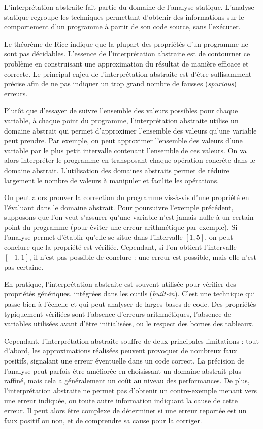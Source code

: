 L'interprétation abstraite fait partie du domaine de l'analyse statique.
L'analyse statique regroupe les techniques permettant d'obtenir des
informations sur le comportement d'un programme à partir de son code
source, sans l'exécuter.

Le théorème de Rice indique que la plupart des propriétés d'un programme
ne sont pas décidables. L'essence de l'interprétation abstraite est de
contourner ce problème en construisant une approximation du résultat de
manière efficace et correcte. Le principal enjeu de
l'interprétation abstraite est d'être suffisamment précise afin de ne
pas indiquer un trop grand nombre de fausses (\emph{spurious}) erreurs.

Plutôt que d'essayer de suivre l'ensemble des valeurs possibles pour chaque
variable, à chaque point du programme, l'interprétation abstraite utilise un
domaine abstrait qui permet d'approximer l'ensemble des valeurs qu'une variable
peut prendre. Par exemple, on peut approximer l'ensemble des valeurs d'une
variable par le plus petit intervalle contenant l'ensemble de ces valeurs. On va
alors interpréter le programme en transposant chaque opération concrète dans le
domaine abstrait. L'utilisation des domaines abstraits permet de réduire
largement le nombre de valeurs à manipuler et facilite les opérations.

On peut alors prouver la correction du programme vis-à-vis d'une
propriété en l'évaluant dans le domaine abstrait. Pour poursuivre
l'exemple précédent, supposons que l'on veut s'assurer qu'une variable n'est jamais
nulle à un certain point du programme (pour éviter une erreur arithmétique
par exemple). Si l'analyse permet d'établir qu'elle se situe dans
l'intervalle \([1, 5]\), on peut conclure que la propriété est vérifiée.
Cependant, si l'on obtient l'intervalle \([-1, 1]\), il n'est pas possible
de conclure : une erreur est possible, mais elle n'est pas certaine.

En pratique, l'interprétation abstraite est souvent utilisée pour
vérifier des propriétés génériques, intégrées dans les outils
(\emph{built-in}). C'est une technique qui
passe bien à l'échelle et qui peut analyser de larges bases de code. Des
propriétés typiquement vérifiées sont l'absence d'erreurs arithmétiques,
l'absence de variables utilisées avant d'être initialisées, ou le
respect des bornes des tableaux.

Cependant, l'interprétation abstraite souffre de deux principales limitations
: tout d'abord, les approximations réalisées peuvent provoquer de
nombreux faux positifs, signalant une erreur éventuelle dans un code
correct. La précision de l'analyse peut parfois être améliorée en
choisissant un domaine abstrait plus raffiné, mais cela a généralement
un coût au niveau des performances. De plus, l'interprétation abstraite
ne permet pas d'obtenir un contre-exemple menant vers une erreur
indiquée, ou toute autre information indiquant la cause de cette erreur.
Il peut alors être complexe de déterminer si une erreur reportée est un
faux positif ou non, et de comprendre sa cause pour la corriger.

